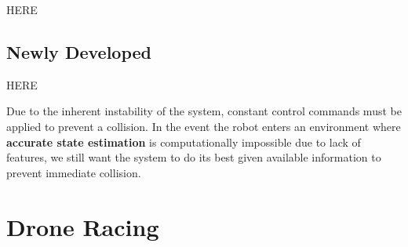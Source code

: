 HERE


\subsection{Newly Developed}
HERE


Due to the inherent instability of the system, constant control commands must be applied to
prevent a collision. In the event the robot enters an environment where \textbf{accurate state estimation}
is computationally impossible due to lack of features, we still want the system to do its best given
available information to prevent immediate collision.














\section{Drone Racing}

